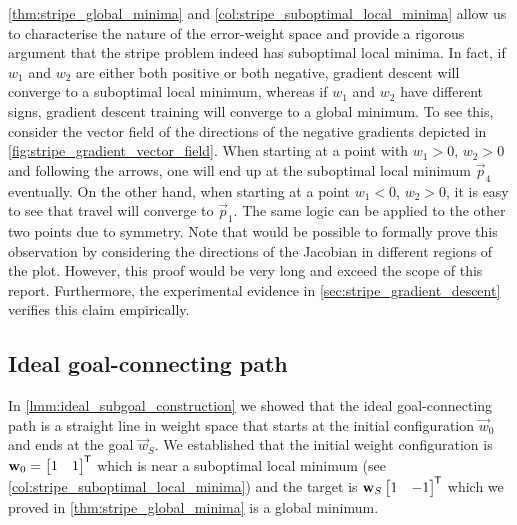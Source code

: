 \ref{thm:stripe_global_minima} and \ref{col:stripe_suboptimal_local_minima} allow us to characterise the nature of the error-weight space and provide a rigorous argument that the stripe problem indeed has suboptimal local minima.
In fact, if $w_1$ and $w_2$ are either both positive or both negative, gradient descent will converge to a suboptimal local minimum, whereas if $w_1$ and $w_2$ have different signs, gradient descent training will converge to a global minimum.
To see this, consider the vector field of the directions of the negative gradients depicted in \ref{fig:stripe_gradient_vector_field}.
When starting at a point with $w_1>0$, $w_2>0$ and following the arrows, one will end up at the suboptimal local minimum $\vec{p}_4$ eventually.
On the other hand, when starting at a point $w_1<0$, $w_2>0$, it is easy to see that travel will converge to $\vec{p}_1$.
The same logic can be applied to the other two points due to symmetry.
Note that would be possible to formally prove this observation by considering the directions of the Jacobian in different regions of the plot. 
However, this proof would be very long and exceed the scope of this report. 
Furthermore, the experimental evidence in \ref{sec:stripe_gradient_descent} verifies this claim empirically.

\subsection{Ideal goal-connecting path}
\label{sec:stripe_ideal_goal_connecting_path}
In \ref{lmm:ideal_subgoal_construction} we showed that the ideal goal-connecting path is a straight line in weight space that starts at the initial configuration $\vec{w}_0$ and ends at the goal $\vec{w}_S$.
We established that the initial weight configuration is
$\mathbf{w}_0 = \begin{bmatrix}
    1 & 1
\end{bmatrix}^{\mkern-1.5mu\mathsf{T}}$
which is near a suboptimal local minimum (see \ref{col:stripe_suboptimal_local_minima}) and the target is 
$\mathbf{w}_S \begin{bmatrix}
    1 & -1
\end{bmatrix}^{\mkern-1.5mu\mathsf{T}}$
which we proved in \ref{thm:stripe_global_minima} is a global minimum.

